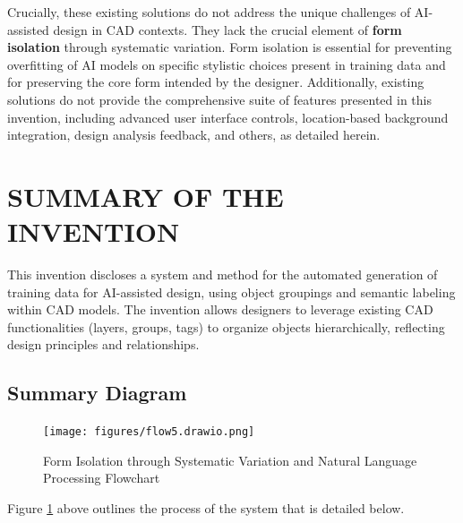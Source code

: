 \documentclass[12pt]{article}
\begin{document}
Crucially, these existing solutions do not address the unique challenges of AI-assisted design in CAD contexts. They lack the crucial element of \textbf{form isolation} through systematic variation. Form isolation is essential for preventing overfitting of AI models on specific stylistic choices present in training data and for preserving the core form intended by the designer. Additionally, existing solutions do not provide the comprehensive suite of features presented in this invention, including advanced user interface controls, location-based background integration, design analysis feedback, and others, as detailed herein.

\section{SUMMARY OF THE INVENTION}
This invention discloses a system and method for the automated generation of training data for AI-assisted design, using object groupings and semantic labeling within CAD models. The invention allows designers to leverage existing CAD functionalities (layers, groups, tags) to organize objects hierarchically, reflecting design principles and relationships. 



\subsection{Summary Diagram}
\begin{figure}[H]
    \centering
    \texttt{[image: figures/flow5.drawio.png]}
    \caption{Form Isolation through Systematic Variation and Natural Language Processing Flowchart}
    \label{fig:firstflowchart}
\end{figure}



Figure \ref{fig:firstflowchart} above outlines the process of the system that is detailed below.
\end{document}
